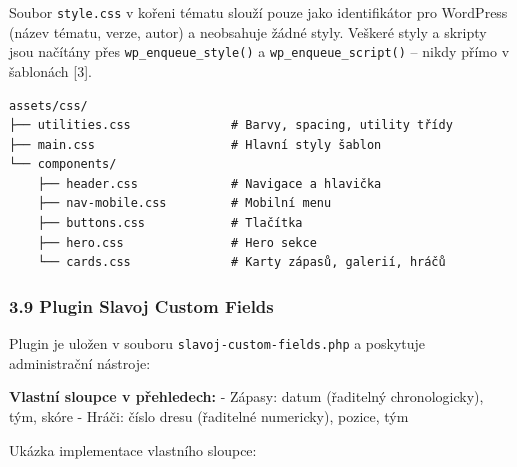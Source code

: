 Soubor \texttt{style.css} v kořeni tématu slouží pouze jako
identifikátor pro WordPress (název tématu, verze, autor) a neobsahuje
žádné styly. Veškeré styly a skripty jsou načítány přes
\texttt{wp\_enqueue\_style()} a \texttt{wp\_enqueue\_script()} -- nikdy
přímo v šablonách {[}3{]}.

\begin{verbatim}
assets/css/
├── utilities.css              # Barvy, spacing, utility třídy
├── main.css                   # Hlavní styly šablon
└── components/
    ├── header.css             # Navigace a hlavička
    ├── nav-mobile.css         # Mobilní menu
    ├── buttons.css            # Tlačítka
    ├── hero.css               # Hero sekce
    └── cards.css              # Karty zápasů, galerií, hráčů
\end{verbatim}

\subsubsection{3.9 Plugin Slavoj Custom
Fields}\label{plugin-slavoj-custom-fields}

Plugin je uložen v souboru \texttt{slavoj-custom-fields.php} a poskytuje
administrační nástroje:

\textbf{Vlastní sloupce v přehledech:} - Zápasy: datum (řaditelný
chronologicky), tým, skóre - Hráči: číslo dresu (řaditelné numericky),
pozice, tým

Ukázka implementace vlastního sloupce:

\begin{Shaded}
\begin{Highlighting}[]
\OtherTok{,} \NormalTok{) \{}
    \NormalTok{ (} \OperatorTok{===} \NormalTok{) \{}
         \OperatorTok{=}\OtherTok{,} \OtherTok{,} \NormalTok{)}\OtherTok{;}
        \NormalTok{ (}\NormalTok{) \{}
             \OperatorTok{=} \OtherTok{,} \NormalTok{)}\OtherTok{;}
              \NormalTok{)) }\OtherTok{:}\NormalTok{)}\OtherTok{;}
\NormalTok{        \}}
\NormalTok{    \}}
\NormalTok{\}}
\end{Highlighting}
\end{Shaded}

